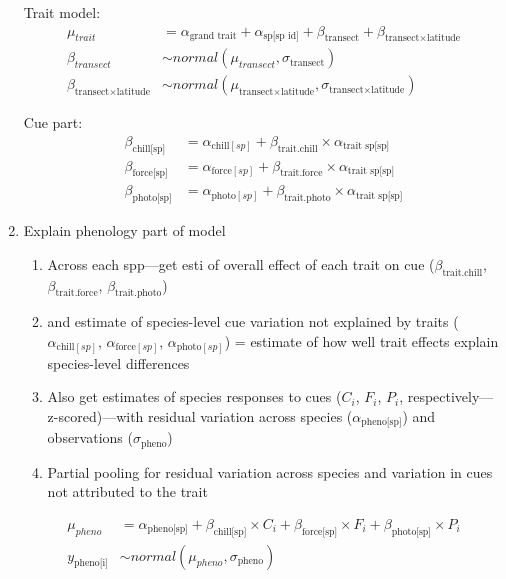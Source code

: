 \documentclass{article}
\begin{document}
\begin{enumerate}
Trait model:
\begin{align}
\mu_{trait} & = \alpha_{\text{grand trait}} + \alpha_{\text{sp[sp id]}} + \beta_{\text{transect}} +\beta_{\text{transect} \times \text{latitude}} \\
\beta_{transect} &  \sim normal( \mu_{transect}, \sigma_{\text{transect}}) \nonumber \\
\beta_{\text{transect} \times \text{latitude}} &  \sim normal( \mu_{\text{transect} \times \text{latitude}}, \sigma_{\text{transect} \times \text{latitude}}) \nonumber 
\end{align}

Cue part:
\begin{align}
\beta_{\text{chill[sp]}} & = \alpha_{\text{chill}[sp]} + \beta_{\text{trait}.\text{chill}} \times \alpha_{\text{trait sp[sp]}} \nonumber \\
\beta_{\text{force[sp]}} & = \alpha_{\text{force}[sp]} + \beta_{\text{trait}.\text{force}} \times \alpha_{\text{trait sp[sp]}} \\
\beta_{\text{photo[sp]}} & = \alpha_{\text{photo}[sp]} + \beta_{\text{trait}.\text{photo}} \times \alpha_{\text{trait sp[sp]}} \nonumber 
\end{align}

\item Explain phenology part of model
\begin{enumerate}
 \item Across each spp---get esti of overall effect of each trait on cue ($\beta_{\text{trait}.\text{chill}}$, $\beta_{\text{trait}.\text{force}}$, $\beta_{\text{trait}.\text{photo}}$)
\item and estimate of species-level cue variation not explained by traits ($\alpha_{\text{chill}[sp]} $, $\alpha_{\text{force}[sp]}$, $\alpha_{\text{photo}[sp]}$) = estimate of how well trait effects explain species-level differences
\item Also get estimates of species responses to cues ($C_i$, $F_i$, $P_i$, respectively---z-scored)---with residual variation across species ($\alpha_{\text{pheno[sp]}}$) and observations ($\sigma_{\text{pheno}}$)
\item Partial pooling for residual variation across species and variation in cues not attributed to the trait
\end{enumerate}

\begin{align}
\mu_{pheno} & = \alpha_{\text{pheno[sp]}}+ \beta_{\text{chill[sp]}} \times C_i + \beta_{\text{force[sp]}}\times F_i + \beta_{\text{photo[sp]}} \times P_i\\
y_{\text{pheno[i]}} & \sim normal( \mu_{pheno}, \sigma_{\text{pheno}}) \nonumber 
\end{align}


\end{enumerate}
\end{document}
